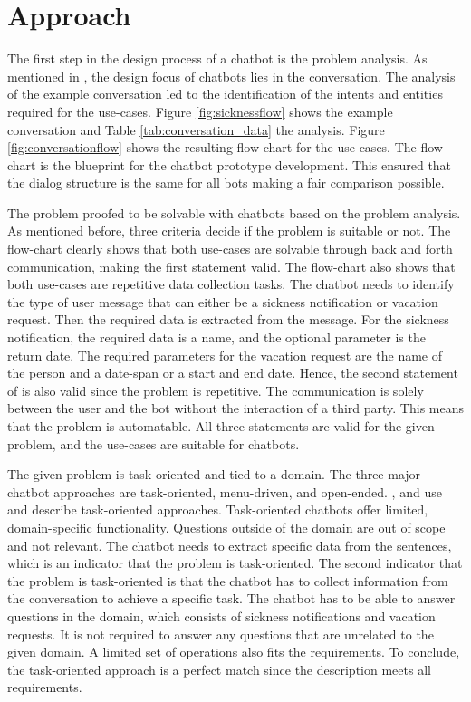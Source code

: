 \section{Approach} %
The first step in the design process of a chatbot is the problem analysis.
As mentioned in \citet{folstad2017chatbots}, the design focus of chatbots lies in the conversation.
The analysis of the example conversation led to the identification of the intents and entities required for the use-cases.
Figure \ref{fig:sicknessflow} shows the example conversation and Table \ref{tab:conversation_data} the analysis.
Figure \ref{fig:conversationflow} shows the resulting flow-chart for the use-cases.
The flow-chart is the blueprint for the chatbot prototype development.
This ensured that the dialog structure is the same for all bots making a fair comparison possible.

The problem proofed to be solvable with chatbots based on the problem analysis.
As mentioned before, three criteria decide if the problem is suitable or not.
The flow-chart clearly shows that both use-cases are solvable through back and forth communication, making the first statement valid.
The flow-chart also shows that both use-cases are repetitive data collection tasks.
The chatbot needs to identify the type of user message that can either be a sickness notification or vacation request.
Then the required data is extracted from the message.
For the sickness notification, the required data is a name, and the optional parameter is the return date.
The required parameters for the vacation request are the name of the person and a date-span or a start and end date.
Hence, the second statement of \citet{singhbuilding} is also valid since the problem is repetitive.
The communication is solely between the user and the bot without the interaction of a third party.
This means that the problem is automatable.
All three statements are valid for the given problem, and the use-cases are suitable for chatbots.

The given problem is task-oriented and tied to a domain.
The three major chatbot approaches are task-oriented, menu-driven, and open-ended. 
\citet{deshpande2017survey, luis2015williams, braunEvaluatingNLU}, and \citet{williams2017hybrid} use and describe task-oriented approaches.
Task-oriented chatbots offer limited, domain-specific functionality. 
Questions outside of the domain are out of scope and not relevant.
The chatbot needs to extract specific data from the sentences, which is an indicator that the problem is task-oriented.
The second indicator that the problem is task-oriented is that the chatbot has to collect information from the conversation to achieve a specific task.
The chatbot has to be able to answer questions in the domain, which consists of sickness notifications and vacation requests.
It is not required to answer any questions that are unrelated to the given domain.
A limited set of operations also fits the requirements.
To conclude, the task-oriented approach is a perfect match since the description meets all requirements.

